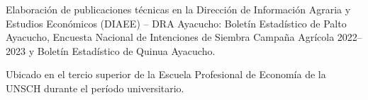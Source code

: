 

\begin{scholarship}
	
	
	
	{Elaboración de publicaciones técnicas en la Dirección de Información Agraria
		y Estudios Económicos (DIAEE) -- DRA Ayacucho: Boletín Estadístico de Palto
		Ayacucho, Encuesta Nacional de Intenciones de Siembra Campaña Agrícola
		2022--2023 y Boletín Estadístico de Quinua Ayacucho.}
	
	{Ubicado en el tercio superior de la Escuela Profesional de Economía
		de la UNSCH durante el período universitario.}
	

\end{scholarship}
